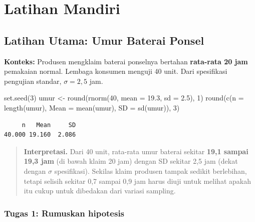 \documentclass[
  indonesian,
  letterpaper,
]{book}
\newenvironment{Shaded}{\begin{snugshade}}{\end{snugshade}}
\newcommand{\AttributeTok}[1]{\textcolor[rgb]{0.40,0.45,0.13}{#1}}
\newcommand{\DecValTok}[1]{\textcolor[rgb]{0.68,0.00,0.00}{#1}}
\newcommand{\FloatTok}[1]{\textcolor[rgb]{0.68,0.00,0.00}{#1}}
\newcommand{\FunctionTok}[1]{\textcolor[rgb]{0.28,0.35,0.67}{#1}}
\newcommand{\NormalTok}[1]{\textcolor[rgb]{0.00,0.23,0.31}{#1}}
\newcommand{\OtherTok}[1]{\textcolor[rgb]{0.00,0.23,0.31}{#1}}
\begin{document}
\section{Latihan Mandiri}\label{latihan-mandiri-1}

\subsection{Latihan Utama: Umur Baterai
Ponsel}\label{latihan-utama-umur-baterai-ponsel}

\textbf{Konteks:} Produsen mengklaim baterai ponselnya bertahan
\textbf{rata-rata 20 jam} pemakaian normal. Lembaga konsumen menguji 40
unit. Dari spesifikasi pengujian standar, \(\sigma = 2{,}5\) jam.

\begin{Shaded}
\begin{Highlighting}[]
\FunctionTok{set.seed}\NormalTok{(}\DecValTok{3}\NormalTok{)}
\NormalTok{umur }\OtherTok{\textless{}{-}} \FunctionTok{round}\NormalTok{(}\FunctionTok{rnorm}\NormalTok{(}\DecValTok{40}\NormalTok{, }\AttributeTok{mean =} \FloatTok{19.3}\NormalTok{, }\AttributeTok{sd =} \FloatTok{2.5}\NormalTok{), }\DecValTok{1}\NormalTok{)}
\FunctionTok{round}\NormalTok{(}\FunctionTok{c}\NormalTok{(}\AttributeTok{n =} \FunctionTok{length}\NormalTok{(umur), }\AttributeTok{Mean =} \FunctionTok{mean}\NormalTok{(umur), }\AttributeTok{SD =} \FunctionTok{sd}\NormalTok{(umur)), }\DecValTok{3}\NormalTok{)}
\end{Highlighting}
\end{Shaded}

\begin{verbatim}
     n   Mean     SD 
40.000 19.160  2.086 
\end{verbatim}

\begin{quote}
\textbf{Interpretasi.} Dari 40 unit, rata-rata umur baterai sekitar
\textbf{19,1 sampai 19,3 jam} (di bawah klaim 20 jam) dengan SD sekitar
2,5 jam (dekat dengan \(\sigma\) spesifikasi). Sekilas klaim produsen
tampak sedikit berlebihan, tetapi selisih sekitar 0,7 sampai 0,9 jam
harus diuji untuk melihat apakah itu cukup untuk dibedakan dari variasi
sampling.
\end{quote}

\subsubsection{Tugas 1: Rumuskan
hipotesis}\label{tugas-1-rumuskan-hipotesis}
\end{document}
